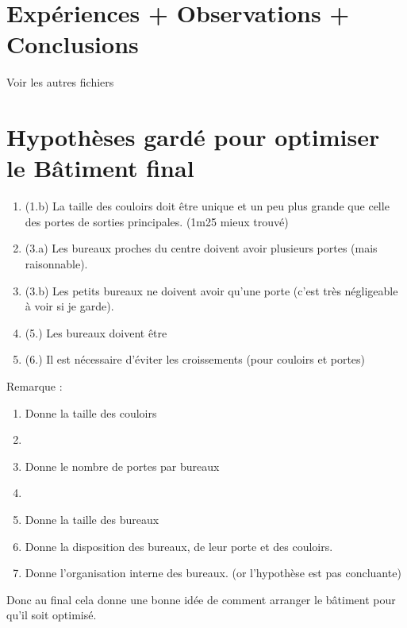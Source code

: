 \documentclass[12pt]{article}
\begin{document}
\section{Expériences + Observations + Conclusions}

Voir les autres fichiers

\section{Hypothèses gardé pour optimiser le Bâtiment final}

\begin{enumerate}
    \item (1.b) La taille des couloirs doit être unique et un peu plus grande que celle des portes de sorties principales. (1m25 mieux trouvé)
    \item (3.a) Les bureaux proches du centre doivent avoir plusieurs portes (mais raisonnable).
    \item (3.b) Les petits bureaux ne doivent avoir qu'une porte (c'est très négligeable à voir si je garde).
    \item (5.) Les bureaux doivent être 
    \item (6.) Il est nécessaire d'éviter les croissements (pour couloirs et portes)
\newline\newline\end{enumerate}

Remarque :
\begin{enumerate}
    \item Donne la taille des couloirs
    \item 
    \item Donne le nombre de portes par bureaux
    \item 
    \item Donne la taille des bureaux
    \item Donne la disposition des bureaux, de leur porte et des couloirs.
    \item Donne l'organisation interne des bureaux. (or l'hypothèse est pas concluante)
\end{enumerate}

Donc au final cela donne une bonne idée de comment arranger le bâtiment pour qu'il soit optimisé.
\end{document}
